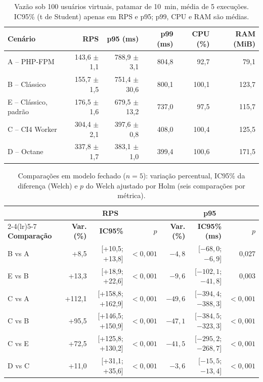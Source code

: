 \documentclass[sigconf, nonacm, screen, language=portuguese, language=spanish, language={main=english}]{acmart}
\begin{document}
\begin{table}[htb]
  \caption{Vazão sob 100 usuários virtuais, patamar de 10~min, média de 5 execuções. IC95\% (t de Student) apenas em RPS e p95; p99, CPU e RAM são médias.}
  \label{tab:global}
  \centering
  \footnotesize
  \setlength{\tabcolsep}{3pt}
  \begin{tabular}{lrrrrr}
    \toprule
    \textbf{Cenário} & \textbf{RPS} & \textbf{p95 (ms)} & \textbf{p99 (ms)} & \textbf{CPU (\%)} & \textbf{RAM (MiB)} \\
    \midrule
    A -- PHP-FPM & 143,6 $\pm$ 1,1 & 788,9 $\pm$ 3,1 & 804,8 & 92,7 & 79,1 \\
    B -- Clássico & 155,7 $\pm$ 1,5 & 751,4 $\pm$ 30,6 & 800,1 & 100,1 & 123,7 \\
    E -- Clássico, padrão & 176,5 $\pm$ 1,6 & 679,5 $\pm$ 13,2 & 737,0 & 97,5 & 115,7 \\
    C -- CI4 Worker & 304,4 $\pm$ 2,1 & 397,6 $\pm$ 0,8 & 408,0 & 100,4 & 125,5 \\
    D -- Octane & 337,8 $\pm$ 1,7 & 383,1 $\pm$ 1,0 & 399,4 & 100,6 & 171,5 \\
    \bottomrule
  \end{tabular}
\end{table}

\begin{table}[htb]
  \caption{Comparações em modelo fechado ($n=5$): variação percentual, IC95\% da diferença (Welch) e $p$ do Welch ajustado por Holm (seis comparações por métrica).}
  \label{tab:pares}
  \centering
  \scriptsize
  \setlength{\tabcolsep}{2pt}
  \begin{tabular}{lrrrrrr}
    \toprule
    & \multicolumn{3}{c}{\textbf{RPS}} & \multicolumn{3}{c}{\textbf{p95}} \\
    \cmidrule(lr){2-4}\cmidrule(lr){5-7}
    \textbf{Comparação} & \textbf{Var. (\%)} & \textbf{IC95\%} & \textbf{$p$} & \textbf{Var. (\%)} & \textbf{IC95\% (ms)} & \textbf{$p$} \\
    \midrule
    B vs A & +8,5   & [+10,5; +13,8]   & $<0,001$ & $-4,8$  & [$-68,0$; $-6,9$]   & 0,027 \\
    E vs B & +13,3  & [+18,9; +22,6]   & $<0,001$ & $-9,6$  & [$-102,1$; $-41,8$] & 0,003 \\
    C vs A & +112,1 & [+158,8; +162,9] & $<0,001$ & $-49,6$ & [$-394,4$; $-388,3$] & $<0,001$ \\
    C vs B & +95,5  & [+146,5; +150,9] & $<0,001$ & $-47,1$ & [$-384,5$; $-323,3$] & $<0,001$ \\
    C vs E & +72,5  & [+125,8; +130,2] & $<0,001$ & $-41,5$ & [$-295,2$; $-268,7$] & $<0,001$ \\
    D vs C & +11,0  & [+31,1; +35,6]   & $<0,001$ & $-3,6$  & [$-15,5$; $-13,4$]  & $<0,001$ \\
    \bottomrule
  \end{tabular}
\end{table}
\end{document}
